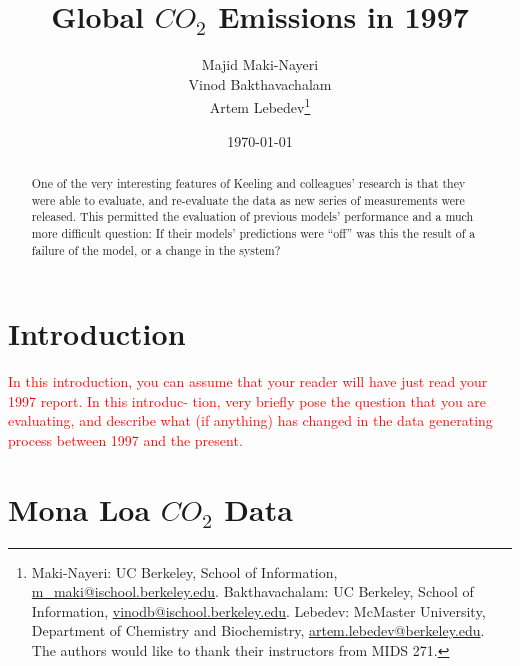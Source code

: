 \documentclass[AER]{AEA}
\begin{document}
\title{Global \(CO_{2}\) Emissions in 1997}


\author{
  Majid Maki-Nayeri\\
  Vinod Bakthavachalam\\
  Artem Lebedev\thanks{
  Maki-Nayeri: UC Berkeley, School of
Information, \href{mailto:m\_maki@ischool.berkeley.edu}{m\_maki@ischool.berkeley.edu}.
  Bakthavachalam: UC Berkeley, School of
Information, \href{mailto:vinodb@ischool.berkeley.edu}{vinodb@ischool.berkeley.edu}.
  Lebedev: McMaster University, Department of Chemistry and
Biochemistry, \href{mailto:artem.lebedev@berkeley.edu}{artem.lebedev@berkeley.edu}.
  The authors would like to thank their instructors from MIDS 271.
}
}

\date{\today}
\JEL{}

\begin{abstract}
One of the very interesting features of Keeling and colleagues' research
is that they were able to evaluate, and re-evaluate the data as new
series of measurements were released. This permitted the evaluation of
previous models' performance and a much more difficult question: If
their models' predictions were ``off'' was this the result of a failure
of the model, or a change in the system?
\end{abstract}


\maketitle

\hypertarget{introduction}{%
\section{Introduction}\label{introduction}}

\textcolor{red}{In this introduction, you can assume that your reader will have just read your 1997 report. In this introduc-
tion, very briefly pose the question that you are evaluating, and describe what (if anything) has changed in
the data generating process between 1997 and the present.}

\hypertarget{mona-loa-co_2-data}{%
\section{\texorpdfstring{Mona Loa \(CO_{2}\)
Data}{Mona Loa CO\_\{2\} Data}}\label{mona-loa-co_2-data}}
\end{document}

